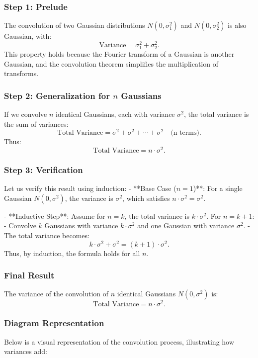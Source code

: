 \documentclass[12pt]{article}
\begin{document}
\subsubsection*{Step 1: Prelude}
The convolution of two Gaussian distributions \( N(0, \sigma_1^2) \) and \( N(0, \sigma_2^2) \) is also Gaussian, with:
\[
\text{Variance} = \sigma_1^2 + \sigma_2^2.
\]
This property holds because the Fourier transform of a Gaussian is another Gaussian, and the convolution theorem simplifies the multiplication of transforms.

\subsubsection*{Step 2: Generalization for \( n \) Gaussians}
If we convolve \( n \) identical Gaussians, each with variance \( \sigma^2 \), the total variance is the sum of variances:
\[
\text{Total Variance} = \sigma^2 + \sigma^2 + \cdots + \sigma^2 \quad \text{(n terms)}.
\]
Thus:
\[
\text{Total Variance} = n \cdot \sigma^2.
\]

\subsubsection*{Step 3: Verification}
Let us verify this result using induction:
- **Base Case (\( n = 1 \))**: For a single Gaussian \( N(0, \sigma^2) \), the variance is \( \sigma^2 \), which satisfies \( n \cdot \sigma^2 = \sigma^2 \).

- **Inductive Step**: Assume for \( n = k \), the total variance is \( k \cdot \sigma^2 \). For \( n = k + 1 \):
  - Convolve \( k \) Gaussians with variance \( k \cdot \sigma^2 \) and one Gaussian with variance \( \sigma^2 \).
  - The total variance becomes:
    \[
    k \cdot \sigma^2 + \sigma^2 = (k + 1) \cdot \sigma^2.
    \]
Thus, by induction, the formula holds for all \( n \).

\subsubsection*{Final Result}
The variance of the convolution of \( n \) identical Gaussians \( N(0, \sigma^2) \) is:
\[
\text{Total Variance} = n \cdot \sigma^2.
\]

\subsubsection*{Diagram Representation}
Below is a visual representation of the convolution process, illustrating how variances add:
\end{document}
